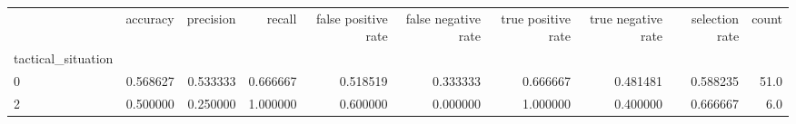 \begin{tabular}{lrrrrrrrrr}
\toprule
{} &  accuracy &  precision &    recall &  false positive rate &  false negative rate &  true positive rate &  true negative rate &  selection rate &  count \\
tactical\_situation &           &            &           &                      &                      &                     &                     &                 &        \\
\midrule
0                  &  0.568627 &   0.533333 &  0.666667 &             0.518519 &             0.333333 &            0.666667 &            0.481481 &        0.588235 &   51.0 \\
2                  &  0.500000 &   0.250000 &  1.000000 &             0.600000 &             0.000000 &            1.000000 &            0.400000 &        0.666667 &    6.0 \\
\bottomrule
\end{tabular}
